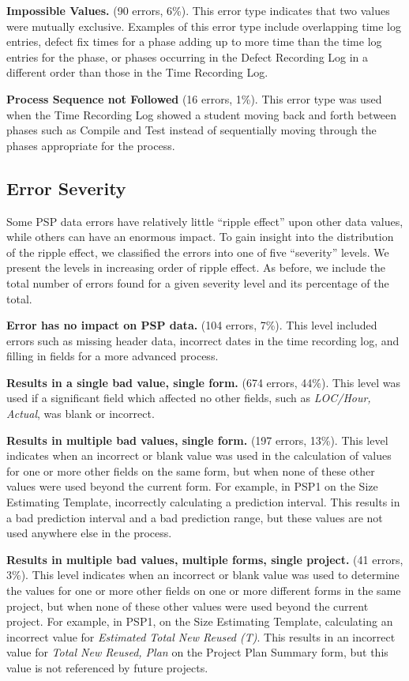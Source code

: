 {\bf Impossible Values.} (90 errors, 6\%). This error type indicates that
two values were mutually exclusive.  Examples of this error type include
overlapping time log entries, defect fix times for a phase adding up to
more time than the time log entries for the phase, or phases occurring in
the Defect Recording Log in a different order than those in the Time
Recording Log.
      
{\bf Process Sequence not Followed} (16 errors, 1\%).  This error type was
used when the Time Recording Log showed a student moving back and forth
between phases such as Compile and Test instead of sequentially moving
through the phases appropriate for the process.\newline


\subsection{Error Severity}

Some PSP data errors have relatively little ``ripple effect'' upon other
data values, while others can have an enormous impact. To gain insight into
the distribution of the ripple effect, we classified the errors into one of
five ``severity'' levels.  We present the levels in increasing order
of ripple effect.  As before, we include the total number of errors
found for a given severity level and its percentage of the total.


{\bf Error has no impact on PSP data.} (104 errors, 7\%). This level
included errors such as missing header data, incorrect dates in the time
recording log, and filling in fields for a more advanced process.
        
{\bf Results in a single bad value, single form.} (674 errors, 44\%).  This
level was used if a significant field which affected no other fields, such
as {\it LOC/Hour, Actual}, was blank or incorrect.
        
{\bf Results in multiple bad values, single form.} (197 errors, 13\%).
This level indicates when an incorrect or blank value was used in the
calculation of values for one or more other fields on the same form, but
when none of these other values were used beyond the current form.  For
example, in PSP1 on the Size Estimating Template, incorrectly calculating a
prediction interval.  This results in a bad prediction interval and a bad
prediction range, but these values are not used anywhere else in the
process.
        
{\bf Results in multiple bad values, multiple forms, single project.} (41
errors, 3\%).  This level indicates when an incorrect or blank value was
used to determine the values for one or more other fields on one or more
different forms in the same project, but when none of these other values
were used beyond the current project.  For example, in PSP1, on the Size
Estimating Template, calculating an incorrect value for {\it Estimated
  Total New Reused (T)}.  This results in an incorrect value for {\it Total
  New Reused, Plan} on the Project Plan Summary form, but this value is not
referenced by future projects.
        
